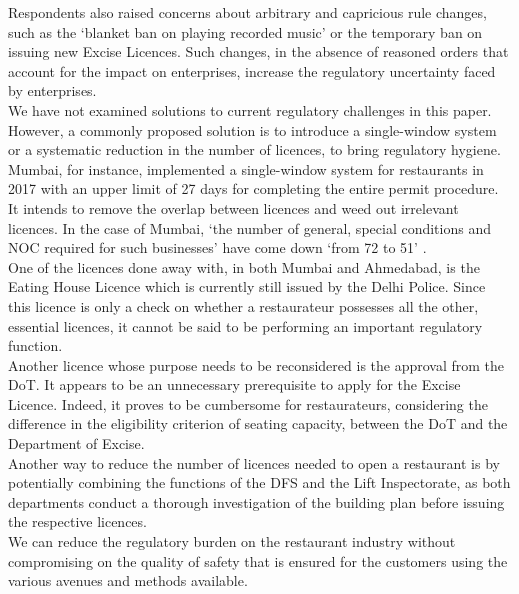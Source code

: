 \documentclass[a4paper, 12pt, twoside]{article}
\begin{document}
		Respondents also raised concerns about arbitrary and capricious rule changes, such as the ‘blanket ban on playing recorded music’ or the temporary ban on issuing new Excise Licences. Such changes, in the absence of reasoned orders that account for 
the impact on enterprises, increase the regulatory uncertainty faced by enterprises.\\
		
		We have not examined solutions to current regulatory challenges in this paper. However, a commonly proposed solution is to introduce a single-window system or a systematic reduction in the number of licences, to bring regulatory hygiene. Mumbai, for 
instance, implemented a single-window system for restaurants in 2017 with an upper limit of 27 days for completing the entire permit procedure. It intends to remove the overlap between licences and weed out irrelevant licences. In the case of Mumbai, ‘the number 
of general, special conditions and NOC required for such businesses’ have come down ‘from 72 to 51’ \parencite{nrai2}.\\
		
		One of the licences done away with, in both Mumbai and Ahmedabad, is the Eating House Licence which is currently still issued by the Delhi Police. Since this licence is only a check on whether a restaurateur possesses all the other, essential licences, it 
cannot be said to be performing an important regulatory function.\\
		
		Another licence whose purpose needs to be reconsidered is the approval from the DoT. It appears to be an unnecessary prerequisite to apply for the Excise Licence. Indeed, it proves to be cumbersome for restaurateurs, considering the difference in the 
eligibility criterion of seating capacity, between the DoT and the Department of Excise.\\
		
		Another way to reduce the number of licences needed to open a restaurant is by potentially combining the functions of the DFS and the Lift Inspectorate, as both departments conduct a thorough investigation of the building plan before issuing the 
respective licences.\\
		
		We can reduce the regulatory burden on the restaurant industry without compromising on the quality of safety that is ensured for the customers using the various avenues and methods available.
\end{document}

